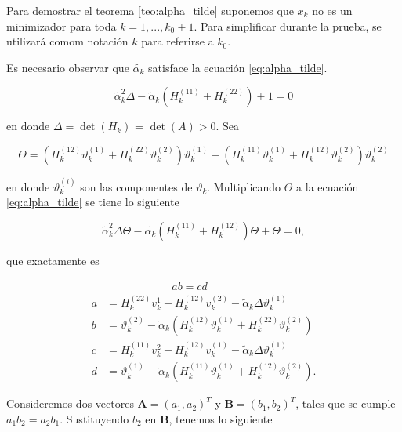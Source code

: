 Para demostrar el teorema \ref{teo:alpha_tilde} suponemos que $x_k$ no es un minimizador para toda $k=1, ..., k_0+1$. Para simplificar durante la prueba, se utilizará comom notación $k$ para referirse a $k_0$.

Es necesario observar que $\tilde{\alpha_k}$ satisface la ecuación \ref{eq:alpha_tilde}.

\begin{equation}
    \tilde{\alpha}^2_k\Delta-\tilde{\alpha}_k\left(H^{(11)}_k + H_k^{(22)}\right) + 1 = 0
    \label{eq:alpha_tilde}
\end{equation}

en donde $\Delta = \det{(H_k)}$ = $\det{(A)}>0$. Sea

\begin{equation*}
    \Theta = \left(H_k^{(12)}\vartheta_k^{(1)}+ H_k^{(22)}\vartheta^{(2)}_k\right)\vartheta_k^{(1)} -  \left(H_k^{(11)}\vartheta_k^{(1)}+ H_k^{(12)}\vartheta^{(2)}_k\right)\vartheta_k^{(2)}
\end{equation*}

en donde $\vartheta_k^{(i)}$ son las componentes de $\vartheta_k$. Multiplicando $\Theta$ a la ecuación \ref{eq:alpha_tilde} se tiene lo siguiente

\begin{equation*}
    \tilde{\alpha}_k^2\Delta\Theta-\tilde{\alpha_k}\left(H_k^{(11)}+H_k^{(12)}\right)\Theta + \Theta = 0,
\end{equation*}

que exactamente es

\begin{align*}
      & \qquad \qquad \qquad ab  =cd                                                                    \\
    a & = H_k^{(22)}v_k^{1}-H_k^{(12)}v_k^{(2)}-\tilde{\alpha}_k\Delta\vartheta_k^{(1)}                 \\
    b & = \vartheta_k ^{(2)}-\tilde{\alpha}_k(H_k^{(12)}\vartheta_k^{(1)}+H_k^{(22)}\vartheta_k^{(2)})  \\
    c & = H_k^{(11)}v_k^{2}-H_k^{(12)}v_k^{(1)}-\tilde{\alpha}_k\Delta\vartheta_k^{(1)}                 \\
    d & = \vartheta_k ^{(1)}-\tilde{\alpha}_k(H_k^{(11)}\vartheta_k^{(1)}+H_k^{(12)}\vartheta_k^{(2)}).
\end{align*}

Consideremos dos vectores $\boldsymbol{A} = (a_1, a_2)^T$ y $\boldsymbol{B} = (b_1, b_2)^T$, tales que se cumple $a_1b_2 = a_2b_1$. Sustituyendo $b_2$ en $\boldsymbol{B}$, tenemos lo siguiente

